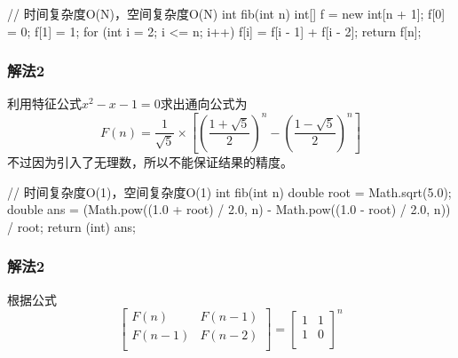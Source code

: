 \begin{Code}
// 时间复杂度O(N)，空间复杂度O(N)
int fib(int n) {
    int[] f = new int[n + 1];
    f[0] = 0;
    f[1] = 1;
    for (int i = 2; i <= n; i++) {
    	f[i] = f[i - 1] + f[i - 2];
    }
    return f[n];
}
\end{Code}

\subsubsection{解法2}
利用特征公式$x^2-x-1=0$求出通向公式为\[F(n)=\frac{1}{\sqrt{5}}×\left[(\frac{1+\sqrt{5}}{2})^n-(\frac{1-\sqrt{5}}{2})^n\right]\]
不过因为引入了无理数，所以不能保证结果的精度。

\begin{Code}
// 时间复杂度O(1)，空间复杂度O(1)
int fib(int n) {
    double root = Math.sqrt(5.0);
    double ans = (Math.pow((1.0 + root) / 2.0, n) - Math.pow((1.0 - root) / 2.0, n)) / root;
    return (int) ans;
}
\end{Code}

\subsubsection{解法2}
根据公式
\[
\left[
\begin{array}{cc}
F(n) & F(n-1) \\
F(n-1) & F(n-2) \\
\end{array}
\right]
=
\left[
\begin{array}{cc}
1 & 1 \\
1 & 0 \\
\end{array}
\right]^n
\]

